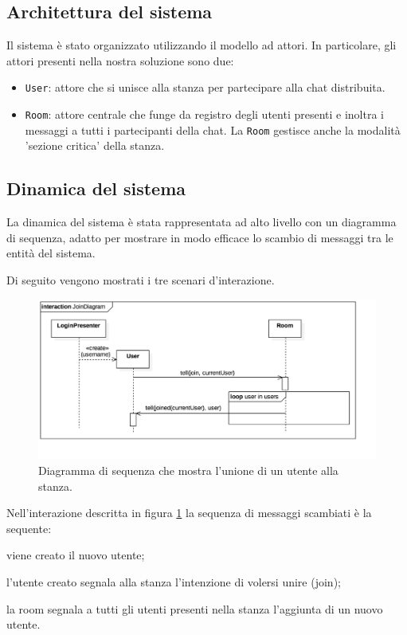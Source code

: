\documentclass[a4paper]{report}
\begin{document}
\subsection{Architettura del sistema}\label{architettura-del-sistema-2}
Il sistema è stato organizzato utilizzando il modello ad attori. In particolare, gli attori presenti nella nostra soluzione sono due:
\begin{itemize}
    \item \texttt{User}: attore che si unisce alla stanza per partecipare alla chat distribuita.
    \item \texttt{Room}: attore centrale che funge da registro degli utenti presenti e inoltra i messaggi a tutti i partecipanti della chat.
    La \texttt{Room} gestisce anche la modalità 'sezione critica' della stanza.
\end{itemize}
\subsection{Dinamica del sistema}\label{dinamica-del-sistema-2}

La dinamica del sistema è stata rappresentata ad alto livello con un diagramma di sequenza, adatto per mostrare in modo efficace lo scambio di messaggi tra le entità del sistema.

Di seguito vengono mostrati i tre scenari d'interazione.

\begin{figure}[H]
    \centering
    \includegraphics[width=\linewidth, height=\textheight, keepaspectratio]{res/JoinDiagram}
    \caption{Diagramma di sequenza che mostra l'unione di un utente alla stanza.}
    \label{fig:join-diagram}
\end{figure}

Nell'interazione descritta in figura \ref{fig:join-diagram} la sequenza di messaggi scambiati è la sequente:
\begin{enumerate*}[label=(\arabic*)]
%
    \item viene creato il nuovo utente;
%
    \item l'utente creato segnala alla stanza l'intenzione di volersi unire (join);
%
    \item la room segnala a tutti gli utenti presenti nella stanza l'aggiunta di un nuovo utente.
%
\end{enumerate*}
\end{document}
